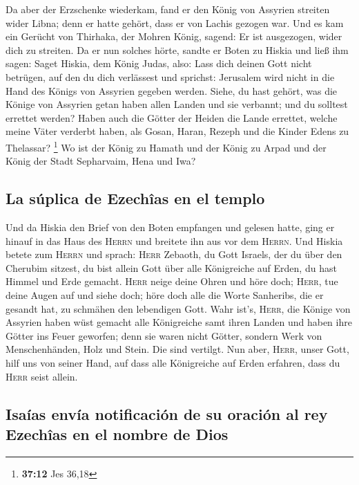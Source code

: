  Da aber der Erzschenke wiederkam, fand er den König von
Assyrien streiten wider Libna; denn er hatte gehört, dass er von Lachis
gezogen war.  Und es kam ein Gerücht von Thirhaka, der
Mohren König, sagend: Er ist ausgezogen, wider dich zu streiten.
 Da er nun solches hörte, sandte er Boten zu Hiskia und
ließ ihm sagen: Saget Hiskia, dem König Judas, also: Lass dich deinen
Gott nicht betrügen, auf den du dich verlässest und sprichst: Jerusalem
wird nicht in die Hand des Königs von Assyrien gegeben werden.
 Siehe, du hast gehört, was die Könige von Assyrien getan
haben allen Landen und sie verbannt; und du solltest errettet werden?
 Haben auch die Götter der Heiden die Lande errettet,
welche meine Väter verderbt haben, als Gosan, Haran, Rezeph und die
Kinder Edens zu Thelassar? \footnote{\textbf{37:12} Jes 36,18}
 Wo ist der König zu Hamath und der König zu Arpad und
der König der Stadt Sepharvaim, Hena und Iwa?

\hypertarget{la-suxfaplica-de-ezechuxeeas-en-el-templo}{%
\subsection{La súplica de Ezechîas en el
templo}\label{la-suxfaplica-de-ezechuxeeas-en-el-templo}}

 Und da Hiskia den Brief von den Boten empfangen und
gelesen hatte, ging er hinauf in das Haus des \textsc{Herrn} und
breitete ihn aus vor dem \textsc{Herrn}.  Und Hiskia
betete zum \textsc{Herrn} und sprach:  \textsc{Herr}
Zebaoth, du Gott Israels, der du über den Cherubim sitzest, du bist
allein Gott über alle Königreiche auf Erden, du hast Himmel und Erde
gemacht.  \textsc{Herr} neige deine Ohren und höre doch;
\textsc{Herr}, tue deine Augen auf und siehe doch; höre doch alle die
Worte Sanheribs, die er gesandt hat, zu schmähen den lebendigen Gott.
 Wahr ist's, \textsc{Herr}, die Könige von Assyrien haben
wüst gemacht alle Königreiche samt ihren Landen  und
haben ihre Götter ins Feuer geworfen; denn sie waren nicht Götter,
sondern Werk von Menschenhänden, Holz und Stein. Die sind vertilgt.
 Nun aber, \textsc{Herr}, unser Gott, hilf uns von seiner
Hand, auf dass alle Königreiche auf Erden erfahren, dass du
\textsc{Herr} seist allein.

\hypertarget{isauxedas-envuxeda-notificaciuxf3n-de-su-oraciuxf3n-al-rey-ezechuxeeas-en-el-nombre-de-dios}{%
\subsection{Isaías envía notificación de su oración al rey Ezechîas en
el nombre de
Dios}\label{isauxedas-envuxeda-notificaciuxf3n-de-su-oraciuxf3n-al-rey-ezechuxeeas-en-el-nombre-de-dios}}

